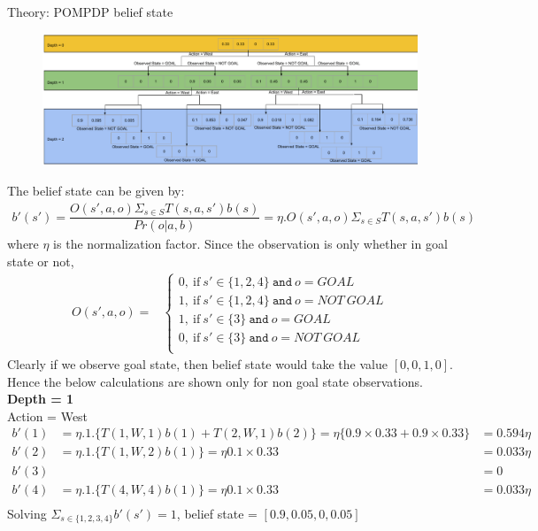 \documentclass[12pt]{article}
\newenvironment{problem}[2][\large Problem]{\begin{trivlist}
\item[\hskip \labelsep {\bfseries #1}\hskip \labelsep {\bfseries #2.}]}{\end{trivlist}}
\begin{document}
\begin{problem} {6} Theory: POMPDP belief state\\
\begin{figure}[h]
	\centering
	\includegraphics[width = 1\linewidth]{Belief_states.pdf}
	\end{figure}
\end{problem}
The belief state can be given by:
\begin{align}
b'(s')= \dfrac{O(s',a,o)\Sigma_{s\in S} T(s,a,s')b(s)}{Pr(o\vert a,b)}= \eta.O(s',a,o)\Sigma_{s\in S} T(s,a,s')b(s)
\nonumber
\end{align}
where $\eta$ is the normalization factor. Since the observation is only whether in goal state or not, 
\begin{align}
O(s', a , o) = &  \begin{cases}
0, ~\text{if}~ s' \in \{1,2,4\} ~ \mathtt{and} ~o = GOAL  \\
1, ~\text{if}~ s' \in \{1,2,4\} ~ \mathtt{and} ~o = NOT~ GOAL  \\
1, ~\text{if}~ s' \in \{3\} ~ \mathtt{and} ~o = GOAL  \\
0, ~\text{if}~ s' \in \{3\} ~ \mathtt{and} ~o = NOT ~GOAL  \\
\end{cases}
\nonumber
\end{align}
Clearly if we observe goal state, then belief state would take the value $[0,0,1,0]$. Hence the below calculations are shown only for non goal state observations.\\

\textbf{Depth = 1}\\
Action = West
\begin{align}
b'(1) &= \eta.1.\{T(1,W,1)b(1) + T(2,W,1)b(2)\}=\eta\{0.9\times0.33 + 0.9\times0.33\} &= 0.594\eta \nonumber\\
b'(2) &= \eta.1.\{T(1,W,2)b(1) \}=\eta 0.1\times0.33 &= 0.033\eta \nonumber\\
b'(3) & &=0 \nonumber\\
b'(4) &= \eta.1.\{T(4,W,4)b(1) \}=\eta 0.1\times0.33 &= 0.033\eta \nonumber\\
\nonumber
\end{align}
Solving $\Sigma_{s \in \{1,2,3,4\}} b'(s')=1$, belief state = $[ 0.9,0.05,0,
0.05]$ \\
\end{document}
